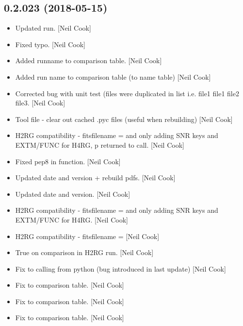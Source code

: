 \documentclass[a4paper,10pt,english]{report}
\begin{document}
\subsection{0.2.023 (2018-05-15)}
\label{\detokenize{misc/changelog:id437}}\begin{itemize}
\item {} 
Updated run. {[}Neil Cook{]}

\item {} 
Fixed typo. {[}Neil Cook{]}

\item {} 
Added runname to comparison table. {[}Neil Cook{]}

\item {} 
Added run name to comparison table (to name table) {[}Neil Cook{]}

\item {} 
Corrected bug with unit test (files were duplicated in list i.e. file1
file1 file2 file3. {[}Neil Cook{]}

\item {} 
Tool file - clear out cached .pyc files (useful when rebuilding) {[}Neil
Cook{]}

\item {} 
H2RG compatibility - fitsfilename =  and only adding
SNR keys and EXTM/FUNC for H4RG, p returned to call. {[}Neil Cook{]}

\item {} 
Fixed pep8 in  function. {[}Neil Cook{]}

\item {} 
Updated date and version + rebuild pdfs. {[}Neil Cook{]}

\item {} 
Updated date and version. {[}Neil Cook{]}

\item {} 
H2RG compatibility - fitsfilename =  and only adding
SNR keys and EXTM/FUNC for H4RG. {[}Neil Cook{]}

\item {} 
H2RG compatibility - fitsfilename =  {[}Neil Cook{]}

\item {} 
True on comparison in H2RG run. {[}Neil Cook{]}

\item {} 
Fix to calling from python (bug introduced in last update) {[}Neil Cook{]}

\item {} 
Fix to  comparison table. {[}Neil Cook{]}

\item {} 
Fix to  comparison table. {[}Neil Cook{]}

\item {} 
Fix to  comparison table. {[}Neil Cook{]}

\end{itemize}
\end{document}
